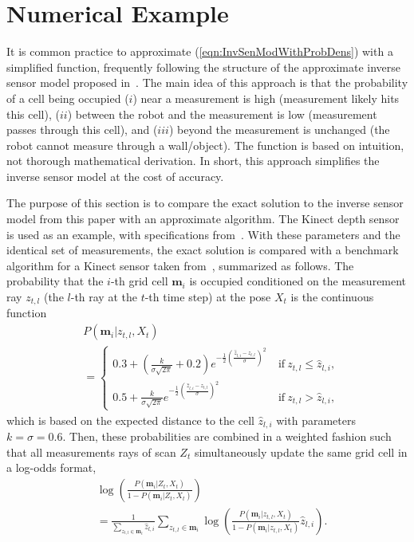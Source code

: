 \documentclass[letterpaper, 10pt, conference]{ieeeconf}
\newcommand{\refeqn}[1]{(\ref{eqn:#1})}
\begin{document}
	
\section{Numerical Example}
\label{sec:NumRes}

 It is common practice to approximate \refeqn{InvSenModWithProbDens} with a simplified function, frequently following the structure of the approximate inverse sensor model proposed in~\cite{And09}.
The main idea of this approach is that the probability of a cell being occupied ($i$) near a measurement is high (measurement likely hits this cell), ($ii$) between the robot and the measurement is low (measurement passes through this cell), and ($iii$) beyond the measurement is unchanged (the robot cannot measure through a wall/object).
The function is based on intuition, not thorough mathematical derivation.
In short, this approach simplifies the inverse sensor model at the cost of accuracy.

The purpose of this section is to compare the exact solution to the inverse sensor model from this paper with an approximate algorithm.
The Kinect depth sensor is used as an example, with specifications from~\cite{KhoElb12}.
With these parameters and the identical set of measurements, the exact solution is compared with a benchmark algorithm for a Kinect sensor taken from~\cite{PirRutBisSch11}, summarized as follows.
The probability that the $i$-th grid cell $\mathbf{m}_i$ is occupied conditioned on the measurement ray $z_{t,l}$ (the $l$-th ray at the $t$-th time step) at the pose $X_t$ is the continuous function
\begin{align}
\label{eqn:ISM_Approx_1}
&P(\mathbf{m}_i|z_{t,l},X_t)\nonumber\\&=\begin{cases}
0.3+(\frac{k}{\sigma\sqrt{2\pi}}+0.2)e^{-\frac12\left(\frac{\hat z_{l,i}-z_{t,l}}{\sigma}\right)^2}\ &\text{if}\ z_{t,l}\leq \hat z_{l,i},
\\
0.5+\frac{k}{\sigma\sqrt{2\pi}}e^{-\frac12\left(\frac{\hat z_{l,i}-z_{t,l}}{\sigma}\right)^2}\ &\text{if}\ z_{t,l}>\hat z_{l,i},
\end{cases}
\end{align}
which is based on the expected distance to the cell $\hat z_{l,i}$ with parameters $k=\sigma=0.6$. Then, these probabilities are combined in a weighted fashion such that all measurements rays of scan $Z_t$ simultaneously update the same grid cell in a log-odds format,
\begin{align}
\label{eqn:ISM_Approx_2}
&\log\left(\frac{P(\mathbf{m}_i|Z_{t},X_t)}{1-P(\mathbf{m}_i|Z_{t},X_t)}\right)
\nonumber\\&=
\frac1{\sum_{z_{t,l}\in\mathbf{m}_i}\hat z_{l,i}}\sum_{z_{t,l}\in\mathbf{m}_i}\log\left(\frac{P(\mathbf{m}_i|z_{t,l},X_t)}{1-P(\mathbf{m}_i|z_{t,l},X_t)}\hat z_{l,i}\right).
\end{align}
\end{document}
